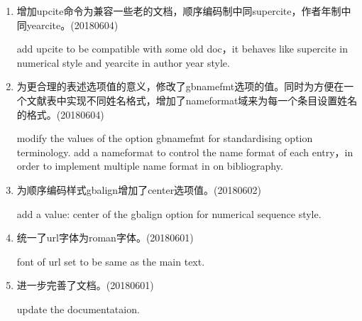 

\label{up:180601}
\begin{enumerate}
\item 增加upcite命令为兼容一些老的文档，顺序编码制中同supercite，作者年制中同yearcite。(20180604)

add upcite to be compatible with some old doc，it behaves like supercite in numerical style and yearcite in author year style.

\item 为更合理的表述选项值的意义，修改了gbnamefmt选项的值。同时为方便在一个文献表中实现不同姓名格式，增加了nameformat域来为每一个条目设置姓名的格式。(20180604)

modify the values of the option gbnamefmt for standardising option terminology. add a nameformat to control the name format of each entry，in order to implement multiple name format in on bibliography.

\item 为顺序编码样式gbalign增加了center选项值。(20180602)

add a value: center of the gbalign option for numerical sequence style.

\item 统一了url字体为roman字体。(20180601)

font of url set to be same as the main text.


\item 进一步完善了文档。(20180601)

update the documentataion.
\end{enumerate}


